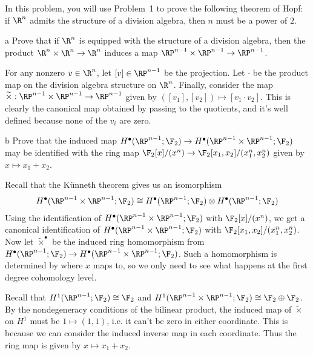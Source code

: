 \documentclass[11pt,letterpaper]{article}
\begin{document}
\begin{solution}
    \quad In this problem, you will use Problem~1 to prove the following theorem of Hopf: if $\R^n$ admits the structure of a division algebra, then $n$ must be a power of $2$.

    \begin{partproblem}{a}
        Prove that if $\R^n$ is equipped with the structure of a division algebra, then the product $\R^n\times \R^n \to \R^n$ induces a map $\RP^{n-1}\times \RP^{n-1}\to \RP^{n-1}$.
    \end{partproblem}

    \quad For any nonzero $v\in \R^n$, let $[v]\in \RP^{n-1}$ be the projection. Let $\cdot$ be the product map on the division algebra structure on $\R^n$. Finally, consider the map $\widetilde{\times} : \RP^{n-1}\times \RP^{n-1}\to \RP^{n-1}$ given by $([v_1], [v_2]) \mapsto [v_1\cdot v_2]$. This is clearly the canonical map obtained by passing to the quotients, and it's well defined because none of the $v_i$ are zero.
    
    \begin{partproblem}{b}
        Prove that the induced map $H^\bullet(\RP^{n-1}; \F_2) \to H^\bullet(\RP^{n-1}\times \RP^{n-1}; \F_2)$ may be identified with the ring map $\F_2[x] /(x^n) \to \F_2[x_1,x_2] / (x_1^n, x_2^n)$ given by $x\mapsto x_1+x_2$.
    \end{partproblem}

    \quad Recall that the K\"unneth theorem gives us an isomorphism 
    \[
        \begin{aligned}
            H^\bullet(\RP^{n-1}\times \RP^{n-1}; \F_2) \cong H^\bullet(\RP^{n-1}; \F_2)\otimes H^\bullet(\RP^{n-1}; \F_2)
        \end{aligned}
    \]
    Using the identification of $H^\bullet(\RP^{n-1}\times \RP^{n-1}; \F_2)$ with $\F_2[x] / (x^n)$, we get a canonical identification of $H^\bullet(\RP^{n-1}\times \RP^{n-1}; \F_2)$ with $\F_2[x_1, x_2] / (x_1^n, x_2^n)$. Now let $\widetilde{\times}^\bullet$ be the induced ring homomorphism from $H^\bullet(\RP^{n-1}; \F_2) \to H^\bullet(\RP^{n-1}\times \RP^{n-1}; \F_2)$. Such a homomorphism is determined by where $x$ maps to, so we only need to see what happens at the first degree cohomology level.

    \quad Recall that $H^1(\RP^{n-1}; \F_2)\cong \F_2$ and $H^1(\RP^{n-1}\times \RP^{n-1}; \F_2)\cong \F_2\oplus \F_2$. By the nondegeneracy conditions of the bilinear product, the induced map of $\widetilde{\times}$ on $H^1$ must be $1\mapsto (1,1)$, i.e. it can't be zero in either coordinate. This is because we can consider the induced inverse map in each coordinate. Thus the ring map is given by $x\mapsto x_1+x_2$.


\end{solution}
\end{document}
